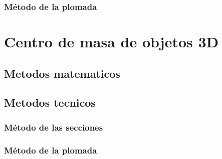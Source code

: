 \documentclass[16pt,]{krantz}
\theoremstyle{definition}
\theoremstyle{definition}
\theoremstyle{definition}
\theoremstyle{definition}
\theoremstyle{remark}
\begin{document}
\hypertarget{muxe9todo-de-la-plomada}{%
\subsubsection{Método de la plomada}\label{muxe9todo-de-la-plomada}}

\hypertarget{centro-de-masa-de-objetos-3d}{%
\section{Centro de masa de objetos 3D}\label{centro-de-masa-de-objetos-3d}}

\hypertarget{metodos-matematicos-1}{%
\subsection{Metodos matematicos}\label{metodos-matematicos-1}}

\hypertarget{metodos-tecnicos-1}{%
\subsection{Metodos tecnicos}\label{metodos-tecnicos-1}}

\hypertarget{muxe9todo-de-las-secciones}{%
\subsubsection{Método de las secciones}\label{muxe9todo-de-las-secciones}}

\hypertarget{muxe9todo-de-la-plomada-1}{%
\subsubsection{Método de la plomada}\label{muxe9todo-de-la-plomada-1}}



\printindex
\end{document}
